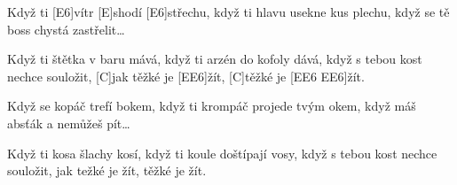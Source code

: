 
\sloka
[E\maj]Když ti [E6]vítr [E\maj]shodí [E6]střechu,
když ti hlavu usekne kus plechu,
když se tě boss chystá zastřelit…

\sloka
Když ti štětka v baru mává,
když ti arzén do kofoly dává,
když s tebou kost nechce souložit,
[C]jak těžké je [E\maj E6]žít,
[C]těžké je [E\maj E6 E\maj E6]žít.

\sloka
Když se kopáč trefí bokem,
když ti krompáč projede tvým okem,
když máš absťák a nemůžeš pít…

\sloka
Když ti kosa šlachy kosí,
když ti koule doštípají vosy,
když s tebou kost nechce souložit,
jak težké je žít, těžké je žít.
